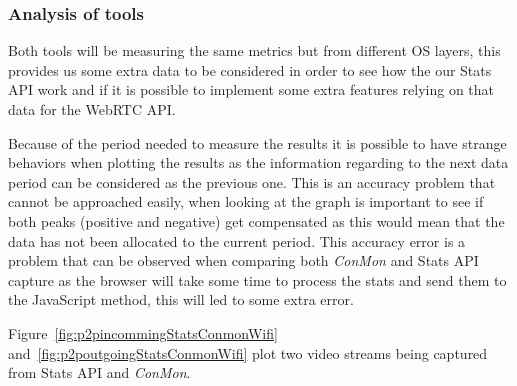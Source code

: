 \subsubsection{Analysis of tools}

Both tools will be measuring the same metrics but from different OS layers, this provides us some extra data to be considered in order to see how the our Stats API work and if it is possible to implement some extra features relying on that data for the WebRTC API.

Because of the period needed to measure the results it is possible to have strange behaviors when plotting the results as the information regarding to the next data period can be considered as the previous one. This is an accuracy problem that cannot be approached easily, when looking at the graph is important to see if both peaks (positive and negative) get compensated as this would mean that the data has not been allocated to the current period. This accuracy error is a problem that can be observed when comparing both {\it ConMon} and Stats API capture as the browser will take some time to process the stats and send them to the JavaScript method, this will led to some extra error.

Figure~\ref{fig:p2pincommingStatsConmonWifi} and~\ref{fig:p2poutgoingStatsConmonWifi} plot two video streams being captured from Stats API and {\it ConMon}.

